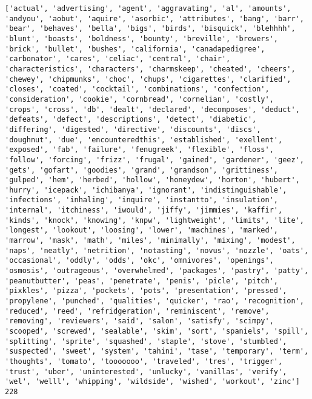 \documentclass[11pt]{article}
\begin{document}
    \begin{Verbatim}[commandchars=\\\{\}]
['actual', 'advertising', 'agent', 'aggravating', 'al', 'amounts', 'andyou', 'aobut', 'aquire', 'asorbic', 'attributes', 'bang', 'barr', 'bear', 'behaves', 'bella', 'bigs', 'birds', 'bisquick', 'blehhhh', 'blunt', 'boasts', 'boldness', 'bounty', 'breville', 'brewers', 'brick', 'bullet', 'bushes', 'california', 'canadapedigree', 'carbonator', 'cares', 'celiac', 'central', 'chair', 'characteristics', 'characters', 'charmskeep', 'cheated', 'cheers', 'chewey', 'chipmunks', 'choc', 'chups', 'cigarettes', 'clarified', 'closes', 'coated', 'cocktail', 'combinations', 'confection', 'consideration', 'cookie', 'cornbread', 'cornelian', 'costly', 'crops', 'cross', 'db', 'dealt', 'declared', 'decomposes', 'deduct', 'defeats', 'defect', 'descriptions', 'detect', 'diabetic', 'differing', 'digested', 'directive', 'discounts', 'discs', 'doughnut', 'due', 'encounteredthis', 'established', 'exellent', 'exposed', 'fab', 'failure', 'fenugreek', 'flexible', 'floss', 'follow', 'forcing', 'frizz', 'frugal', 'gained', 'gardener', 'geez', 'gets', 'gofart', 'goodies', 'grand', 'grandson', 'grittiness', 'gulped', 'hem', 'herbed', 'hollow', 'honeydew', 'horton', 'hubert', 'hurry', 'icepack', 'ichibanya', 'ignorant', 'indistinguishable', 'infections', 'inhaling', 'inquire', 'instantto', 'insulation', 'internal', 'itchiness', 'iwould', 'jiffy', 'jimmies', 'kaffir', 'kinds', 'knock', 'knowing', 'knpw', 'lightweight', 'limits', 'lite', 'longest', 'lookout', 'loosing', 'lower', 'machines', 'marked', 'marrow', 'mask', 'math', 'miles', 'minimally', 'mixing', 'modest', 'naps', 'neatly', 'netrition', 'notasting', 'novus', 'nozzle', 'oats', 'occasional', 'oddly', 'odds', 'okc', 'omnivores', 'openings', 'osmosis', 'outrageous', 'overwhelmed', 'packages', 'pastry', 'patty', 'peanutbutter', 'peas', 'penetrate', 'penis', 'picle', 'pitch', 'pixkles', 'pizza', 'pockets', 'pots', 'presentation', 'pressed', 'propylene', 'punched', 'qualities', 'quicker', 'rao', 'recognition', 'reduced', 'reed', 'refridgeration', 'reminiscent', 'remove', 'removing', 'reviewers', 'said', 'salon', 'satisfy', 'scimpy', 'scooped', 'screwed', 'sealable', 'skim', 'sort', 'spaniels', 'spill', 'splitting', 'sprite', 'squashed', 'staple', 'stove', 'stumbled', 'suspected', 'sweet', 'system', 'tahini', 'tase', 'temporary', 'term', 'thoughts', 'tomato', 'tooooooo', 'traveled', 'tres', 'trigger', 'trust', 'uber', 'uninterested', 'unlucky', 'vanillas', 'verify', 'wel', 'welll', 'whipping', 'wildside', 'wished', 'workout', 'zinc']
228

    \end{Verbatim}
\end{document}
